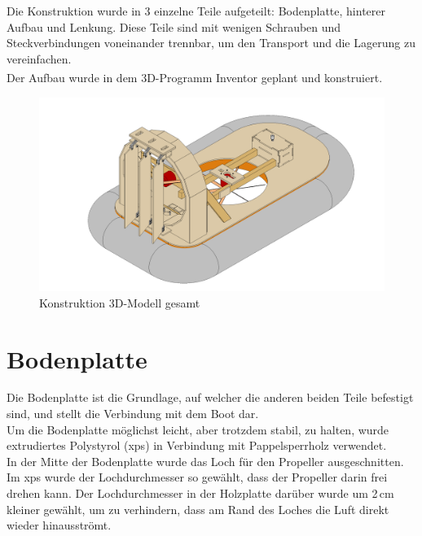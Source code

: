 Die Konstruktion wurde in 3 einzelne Teile aufgeteilt: Bodenplatte, hinterer Aufbau und Lenkung. Diese Teile sind mit wenigen Schrauben und Steckverbindungen voneinander trennbar, um den Transport und die Lagerung zu vereinfachen.\\
Der Aufbau wurde in dem 3D-Programm Inventor\textsuperscript{\cite{Inventor}} geplant und konstruiert.\\
\begin{figure}[H]
    \centering
    \includegraphics[width=\textwidth]{../Inventor/Luftkissenboot.png}
    \caption{Konstruktion 3D-Modell gesamt}
\end{figure}

\clearpage
\section{Bodenplatte}
Die Bodenplatte ist die Grundlage, auf welcher die anderen beiden Teile befestigt sind, und stellt die Verbindung mit dem Boot dar.\\
Um die Bodenplatte möglichst leicht, aber trotzdem stabil, zu halten, wurde extrudiertes Polystyrol (\acs{xps}) in Verbindung mit Pappelsperrholz verwendet.\\
In der Mitte der Bodenplatte wurde das Loch für den Propeller ausgeschnitten. Im \acs{xps} wurde der Lochdurchmesser so gewählt, dass der Propeller darin frei drehen kann. Der Lochdurchmesser in der Holzplatte darüber wurde um 2\,cm kleiner gewählt, um zu verhindern, dass am Rand des Loches die Luft direkt wieder hinausströmt.

